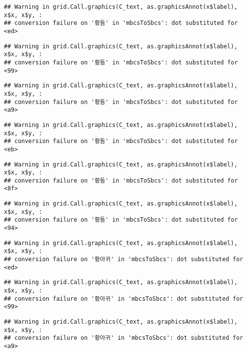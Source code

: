 \documentclass[
]{article}
\begin{document}
\begin{verbatim}
## Warning in grid.Call.graphics(C_text, as.graphicsAnnot(x$label), x$x, x$y, :
## conversion failure on '황돔' in 'mbcsToSbcs': dot substituted for <ed>
\end{verbatim}

\begin{verbatim}
## Warning in grid.Call.graphics(C_text, as.graphicsAnnot(x$label), x$x, x$y, :
## conversion failure on '황돔' in 'mbcsToSbcs': dot substituted for <99>
\end{verbatim}

\begin{verbatim}
## Warning in grid.Call.graphics(C_text, as.graphicsAnnot(x$label), x$x, x$y, :
## conversion failure on '황돔' in 'mbcsToSbcs': dot substituted for <a9>
\end{verbatim}

\begin{verbatim}
## Warning in grid.Call.graphics(C_text, as.graphicsAnnot(x$label), x$x, x$y, :
## conversion failure on '황돔' in 'mbcsToSbcs': dot substituted for <eb>
\end{verbatim}

\begin{verbatim}
## Warning in grid.Call.graphics(C_text, as.graphicsAnnot(x$label), x$x, x$y, :
## conversion failure on '황돔' in 'mbcsToSbcs': dot substituted for <8f>
\end{verbatim}

\begin{verbatim}
## Warning in grid.Call.graphics(C_text, as.graphicsAnnot(x$label), x$x, x$y, :
## conversion failure on '황돔' in 'mbcsToSbcs': dot substituted for <94>
\end{verbatim}

\begin{verbatim}
## Warning in grid.Call.graphics(C_text, as.graphicsAnnot(x$label), x$x, x$y, :
## conversion failure on '황아귀' in 'mbcsToSbcs': dot substituted for <ed>
\end{verbatim}

\begin{verbatim}
## Warning in grid.Call.graphics(C_text, as.graphicsAnnot(x$label), x$x, x$y, :
## conversion failure on '황아귀' in 'mbcsToSbcs': dot substituted for <99>
\end{verbatim}

\begin{verbatim}
## Warning in grid.Call.graphics(C_text, as.graphicsAnnot(x$label), x$x, x$y, :
## conversion failure on '황아귀' in 'mbcsToSbcs': dot substituted for <a9>
\end{verbatim}
\end{document}

